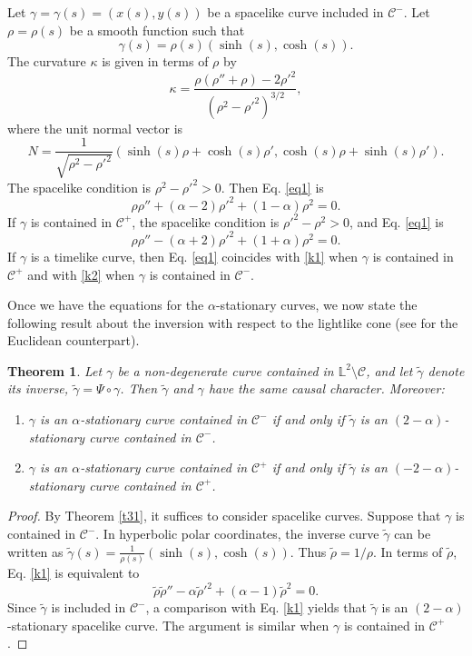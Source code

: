 \documentclass[a4paper,12pt]{amsart}
\newtheorem{theorem}{Theorem}[section]
\theoremstyle{definition}
\def\l{\mathbb L}
\begin{document}
Let $\gamma=\gamma(s)=(x(s),y(s))$ be a  spacelike curve   included in $\mathcal{C}^-$. Let $\rho=\rho(s)$ be a smooth function such that  
$$\gamma(s)=\rho(s)(\sinh(s), \cosh(s)).$$
The curvature $\kappa$ is given in terms of $\rho$ by 
$$\kappa=\frac{\rho  \left(\rho ''+\rho \right)-2 \rho '^2}{\left(\rho ^2-\rho '^2\right)^{3/2}},$$
where the unit normal vector is 
$$N=\frac{1}{\sqrt{\rho^2-\rho'^2}}(\sinh(s)\rho+\cosh(s)\rho',\cosh(s)\rho+\sinh(s)\rho').$$
The spacelike condition is $\rho^2-\rho'^2>0$. Then Eq. \eqref{eq1} is
\begin{equation}\label{k1}
\rho  \rho ''+(\alpha -2) \rho '^2+(1-\alpha ) \rho ^2=0.
\end{equation}
If $\gamma$ is contained in $\mathcal{C}^+$, the spacelike condition is $\rho'^2-\rho^2>0$, and Eq. \eqref{eq1} is
\begin{equation}\label{k2}
\rho\rho''-(\alpha+2)\rho'^2+(1+\alpha)\rho^2=0.
\end{equation}
If $\gamma$ is a timelike curve, then Eq. \eqref{eq1} coincides with \eqref{k1} when $\gamma$ is contained in $\mathcal{C}^+$ and with \eqref{k2} when $\gamma$ is contained in $\mathcal{C}^-$.

Once we have the equations for the $\alpha$-stationary curves, we now state the following result about the inversion with respect to the lightlike cone (see \cite{lo1} for the Euclidean counterpart).

\begin{theorem}\label{ti}
Let $\gamma$ be a non-degenerate curve contained in $\l^2 \setminus \mathcal{C}$, and let $\widetilde{\gamma}$ denote its inverse, $\widetilde{\gamma}=\Psi\circ\gamma$. Then $\widetilde{\gamma}$ and $\gamma$ have the same causal character. Moreover:
\begin{enumerate}
\item $\gamma$ is an $\alpha$-stationary curve contained in $\mathcal{C}^-$ if and only if $\widetilde{\gamma}$ is an $(2-\alpha)$-stationary curve contained in $\mathcal{C}^-$.
\item $\gamma$ is an $\alpha$-stationary curve contained in $\mathcal{C}^+$ if and only if $\widetilde{\gamma}$ is an $(-2-\alpha)$-stationary curve contained in $\mathcal{C}^+$.
\end{enumerate}
\end{theorem}

\begin{proof} 
By Theorem \ref{t31}, it suffices to consider spacelike curves. Suppose that $\gamma$ is contained in $\mathcal{C}^-$. In hyperbolic polar coordinates, the inverse curve $\widetilde{\gamma}$ can be written as $\widetilde{\gamma}(s)=\frac{1}{\rho(s)}(\sinh(s),\cosh(s))$. Thus $\widetilde{\rho}=1/\rho$. In terms of $\widetilde{\rho}$, Eq. \eqref{k1} is equivalent to
$$ \widetilde{\rho}\widetilde{\rho}''-\alpha \widetilde{\rho}'^2+(\alpha-1)\widetilde{\rho}^2=0.$$
Since $\widetilde{\gamma}$ is included in $\mathcal{C}^-$, a comparison with Eq. \eqref{k1} yields that $\widetilde{\gamma}$ is an $(2-\alpha)$-stationary spacelike curve. The argument is similar when $\gamma$ is contained in $\mathcal{C}^+$.
\end{proof}
\end{document}
